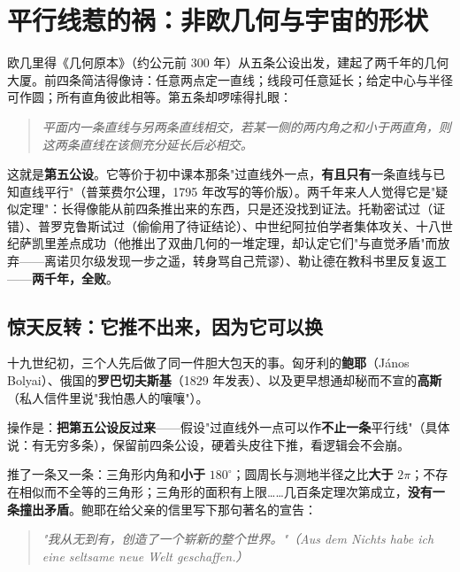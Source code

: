 \chapter{平行线惹的祸：非欧几何与宇宙的形状}

欧几里得《几何原本》（约公元前 300 年）从五条公设出发，建起了两千年的几何大厦。前四条简洁得像诗：任意两点定一直线；线段可任意延长；给定中心与半径可作圆；所有直角彼此相等。第五条却啰嗦得扎眼：

\begin{quote}\itshape
平面内一条直线与另两条直线相交，若某一侧的两内角之和小于两直角，则这两条直线在该侧充分延长后必相交。
\end{quote}

这就是\textbf{第五公设}。它等价于初中课本那条"过直线外一点，\textbf{有且只有}一条直线与已知直线平行"（普莱费尔公理，1795 年改写的等价版）。两千年来人人觉得它是"疑似定理"：长得像能从前四条推出来的东西，只是还没找到证法。托勒密试过（证错）、普罗克鲁斯试过（偷偷用了待证结论）、中世纪阿拉伯学者集体攻关、十八世纪萨凯里差点成功（他推出了双曲几何的一堆定理，却认定它们"与直觉矛盾"而放弃——离诺贝尔级发现一步之遥，转身骂自己荒谬）、勒让德在教科书里反复返工——\textbf{两千年，全败}。

\section{惊天反转：它推不出来，因为它可以换}

十九世纪初，三个人先后做了同一件胆大包天的事。匈牙利的\textbf{鲍耶}（J\'anos Bolyai）、俄国的\textbf{罗巴切夫斯基}（1829 年发表）、以及更早想通却秘而不宣的\textbf{高斯}（私人信件里说"我怕愚人的嚷嚷"）。

操作是：\textbf{把第五公设反过来}——假设"过直线外一点可以作\textbf{不止一条}平行线"（具体说：有无穷多条），保留前四条公设，硬着头皮往下推，看逻辑会不会崩。

推了一条又一条：三角形内角和\textbf{小于} $180^\circ$；圆周长与测地半径之比\textbf{大于} $2\pi$；不存在相似而不全等的三角形；三角形的面积有上限……几百条定理次第成立，\textbf{没有一条撞出矛盾}。鲍耶在给父亲的信里写下那句著名的宣告：

\begin{quote}\centering\itshape
"我从无到有，创造了一个崭新的整个世界。"\quad（Aus dem Nichts habe ich eine seltsame neue Welt geschaffen.）
\end{quote}

